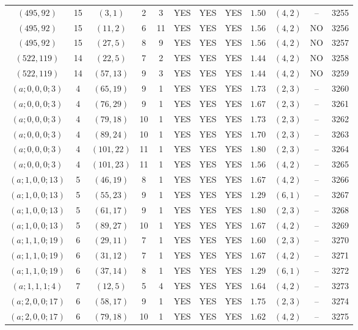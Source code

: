 \begin{longtable}{|c|c|c|c|c|c|c|c|c|c|c|c|}
$(495,92)$ & 15 & $(3,1)$ & 2 & 3 & YES & YES & YES & $1.50$ & $(4,2)$ & -- & 3255\\
$(495,92)$ & 15 & $(11,2)$ & 6 & 11 & YES & YES & YES & $1.56$ & $(4,2)$ & NO & 3256\\
$(495,92)$ & 15 & $(27,5)$ & 8 & 9 & YES & YES & YES & $1.56$ & $(4,2)$ & NO & 3257\\
$(522,119)$ & 14 & $(22,5)$ & 7 & 2 & YES & YES & YES & $1.44$ & $(4,2)$ & NO & 3258\\
$(522,119)$ & 14 & $(57,13)$ & 9 & 3 & YES & YES & YES & $1.44$ & $(4,2)$ & NO & 3259\\
$(a;0,0,0;3)$ & 4 & $(65,19)$ & 9 & 1 & YES & YES & YES & $1.73$ & $(2,3)$ & -- & 3260\\
$(a;0,0,0;3)$ & 4 & $(76,29)$ & 9 & 1 & YES & YES & YES & $1.67$ & $(2,3)$ & -- & 3261\\
$(a;0,0,0;3)$ & 4 & $(79,18)$ & 10 & 1 & YES & YES & YES & $1.73$ & $(2,3)$ & -- & 3262\\
$(a;0,0,0;3)$ & 4 & $(89,24)$ & 10 & 1 & YES & YES & YES & $1.70$ & $(2,3)$ & -- & 3263\\
$(a;0,0,0;3)$ & 4 & $(101,22)$ & 11 & 1 & YES & YES & YES & $1.80$ & $(2,3)$ & -- & 3264\\
$(a;0,0,0;3)$ & 4 & $(101,23)$ & 11 & 1 & YES & YES & YES & $1.56$ & $(4,2)$ & -- & 3265\\
$(a;1,0,0;13)$ & 5 & $(46,19)$ & 8 & 1 & YES & YES & YES & $1.67$ & $(4,2)$ & -- & 3266\\
$(a;1,0,0;13)$ & 5 & $(55,23)$ & 9 & 1 & YES & YES & YES & $1.29$ & $(6,1)$ & -- & 3267\\
$(a;1,0,0;13)$ & 5 & $(61,17)$ & 9 & 1 & YES & YES & YES & $1.80$ & $(2,3)$ & -- & 3268\\
$(a;1,0,0;13)$ & 5 & $(89,27)$ & 10 & 1 & YES & YES & YES & $1.67$ & $(4,2)$ & -- & 3269\\
$(a;1,1,0;19)$ & 6 & $(29,11)$ & 7 & 1 & YES & YES & YES & $1.60$ & $(2,3)$ & -- & 3270\\
$(a;1,1,0;19)$ & 6 & $(31,12)$ & 7 & 1 & YES & YES & YES & $1.67$ & $(4,2)$ & -- & 3271\\
$(a;1,1,0;19)$ & 6 & $(37,14)$ & 8 & 1 & YES & YES & YES & $1.29$ & $(6,1)$ & -- & 3272\\
$(a;1,1,1;4)$ & 7 & $(12,5)$ & 5 & 4 & YES & YES & YES & $1.64$ & $(4,2)$ & -- & 3273\\
$(a;2,0,0;17)$ & 6 & $(58,17)$ & 9 & 1 & YES & YES & YES & $1.75$ & $(2,3)$ & -- & 3274\\
$(a;2,0,0;17)$ & 6 & $(79,18)$ & 10 & 1 & YES & YES & YES & $1.62$ & $(4,2)$ & -- & 3275\\

\end{longtable}
